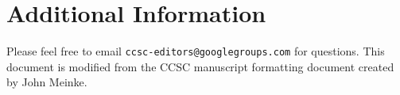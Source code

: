 \documentclass{article}
\begin{document}
\section{Additional Information}
Please feel free to email \verb+ccsc-editors@googlegroups.com+ for questions.
This document is modified from the CCSC manuscript formatting
document\cite{meinke} created by John Meinke.

\medskip

\printbibliography
\end{document}
